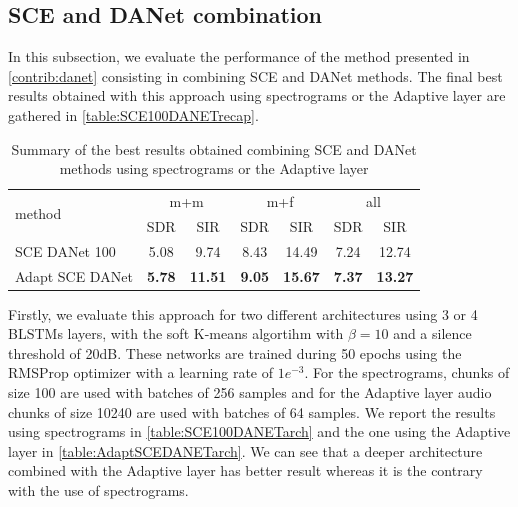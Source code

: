 \documentclass[master, tikz, final,11pt, dvipdfmx]{iscs-thesis}
\begin{document}
\subsection{SCE and DANet combination}
\label{DANET}

In this subsection, we evaluate the performance of the method presented in \ref{contrib:danet} consisting in combining SCE and DANet methods. The final best results obtained with this approach using spectrograms or the Adaptive layer are gathered in \autoref{table:SCE100DANETrecap}.

\begin{table}[h!]
\centering
\begin{tabular}{l|c|c|c|c|c|c}
 \multirow{2}{*}{method}   & \multicolumn{2}{c|}{m+m} & \multicolumn{2}{c|}{m+f} & \multicolumn{2}{c}{all} \\ 
\cline{2-7}
 & SDR & SIR & SDR & SIR & SDR & SIR \\ 
\hline 
SCE DANet 100 & 5.08 & 9.74 & 8.43 & 14.49 & 7.24 & 12.74 \\ 
Adapt SCE DANet & \textbf{5.78} & \textbf{11.51} & \textbf{9.05} & \textbf{15.67} & \textbf{7.37} & \textbf{13.27} \\  
\end{tabular}
\caption[Summary of the best results obtained combining SCE and DANet methods using spectrograms or the Adaptive layer]{Summary of the best results obtained combining SCE and DANet methods using spectrograms or the Adaptive layer}
\label{table:SCE100DANETrecap}
\end{table}


Firstly, we evaluate this approach for two different architectures using 3 or 4 BLSTMs layers, with the soft K-means algortihm with $\beta=10$ and a silence threshold of 20dB. These networks are trained during 50 epochs using the RMSProp optimizer with a learning rate of $1e^{-3}$. For the spectrograms, chunks of size 100 are used with batches of 256 samples and for the Adaptive layer audio chunks of size 10240 are used with batches of 64 samples. We report the results using spectrograms in \autoref{table:SCE100DANETarch} and the one using the Adaptive layer in \autoref{table:AdaptSCEDANETarch}. We can see that a deeper architecture combined with the Adaptive layer has better result whereas it is the contrary with the use of spectrograms.
\end{document}
